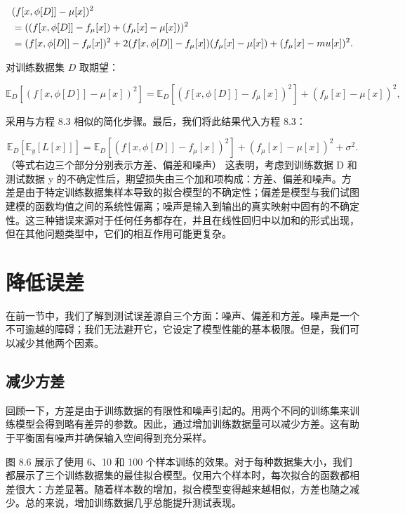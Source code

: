 \documentclass[lang=cn,newtx,10pt,scheme=chinese]{elegantbook}
\begin{document}
\begin{align}
&(f[x, \phi[D]] - \mu[x])^2 \notag \\
&= ((f[x, \phi[D]] - f_\mu[x]) + (f_\mu[x] - \mu[x]))^2 \notag \\
&= (f[x, \phi[D]] - f_\mu[x])^2 + 2(f[x, \phi[D]] - f_\mu[x])(f_\mu[x] - \mu[x]) + (f_\mu[x] - mu[x])^2. 
\end{align} 

对训练数据集 \(D\) 取期望：

\begin{equation}
\mathbb{E}_D [(f[x, \phi[D]] - \mu[x])^2] = \mathbb{E}_D [(f[x, \phi[D]] - f_\mu[x])^2] + (f_\mu[x] - \mu[x])^2, 
\end{equation}

采用与方程 8.3 相似的简化步骤。最后，我们将此结果代入方程 8.3：

\begin{equation}
\mathbb{E}_D[\mathbb{E}_y[L[x]]] = \mathbb{E}_D [(f[x, \phi[D]] - f_\mu[x])^2] + (f_\mu[x] - \mu[x])^2 + \sigma^2. 
\end{equation}
（等式右边三个部分分别表示方差、偏差和噪声）
这表明，考虑到训练数据 D 和测试数据 y 的不确定性后，期望损失由三个加和项构成：方差、偏差和噪声。方差是由于特定训练数据集样本导致的拟合模型的不确定性；偏差是模型与我们试图建模的函数均值之间的系统性偏离；噪声是输入到输出的真实映射中固有的不确定性。这三种错误来源对于任何任务都存在，并且在线性回归中以加和的形式出现，但在其他问题类型中，它们的相互作用可能更复杂。
\section{降低误差}

在前一节中，我们了解到测试误差源自三个方面：噪声、偏差和方差。噪声是一个不可逾越的障碍；我们无法避开它，它设定了模型性能的基本极限。但是，我们可以减少其他两个因素。
\subsection{减少方差}
回顾一下，方差是由于训练数据的有限性和噪声引起的。用两个不同的训练集来训练模型会得到略有差异的参数。因此，通过增加训练数据量可以减少方差。这有助于平衡固有噪声并确保输入空间得到充分采样。

图 8.6 展示了使用 6、10 和 100 个样本训练的效果。对于每种数据集大小，我们都展示了三个训练数据集的最佳拟合模型。仅用六个样本时，每次拟合的函数都相差很大：方差显著。随着样本数的增加，拟合模型变得越来越相似，方差也随之减少。总的来说，增加训练数据几乎总能提升测试表现。
\end{document}
